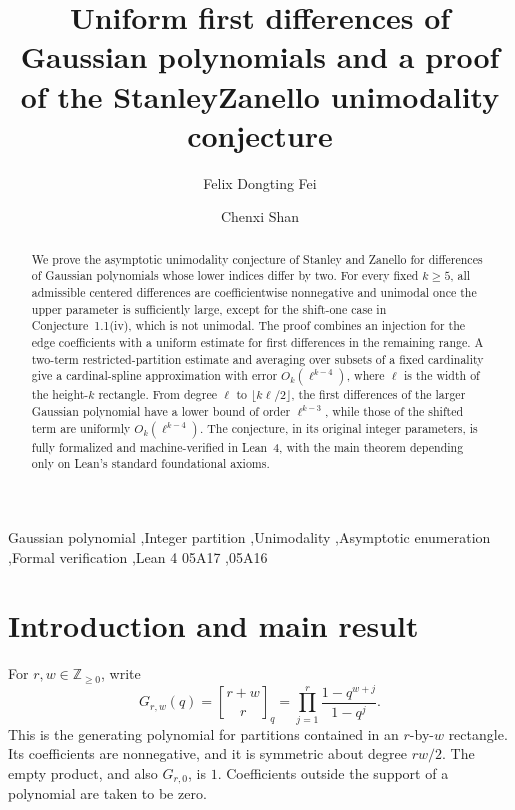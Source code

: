 \documentclass[3p,11pt,number]{elsarticle}
\theoremstyle{remark}
\numberwithin{equation}{section}
\newcommand{\qbinom}[2]{\genfrac{[}{]}{0pt}{}{#1}{#2}_q}
\newcommand{\NN}{\mathbb Z_{\ge0}}
\newcommand{\PaperTitle}{Uniform first differences of Gaussian polynomials and a proof of the Stanley\textendash{}Zanello unimodality conjecture}
\begin{document}
\begin{frontmatter}
\title{\PaperTitle}
\author[fei]{Felix Dongting Fei}
\author[shan]{Chenxi Shan}
\address[fei]{Independent Researcher, London, United Kingdom}
\address[shan]{City University of Hong Kong, Hong Kong SAR, China}
\begin{abstract}
We prove the asymptotic unimodality conjecture of Stanley and Zanello for
differences of Gaussian polynomials whose lower indices differ by two.
For every fixed \(k\ge5\), all admissible centered differences are
coefficientwise nonnegative and unimodal once the upper parameter is
sufficiently large, except for the shift-one case in Conjecture~1.1(iv), which is not
unimodal.
The proof combines an injection for the edge coefficients with a uniform
estimate for first differences in the remaining range. A two-term
restricted-partition estimate and averaging over subsets of a fixed
cardinality give a cardinal-spline approximation with error
\(O_k(\ell^{k-4})\), where \(\ell\) is the width of the height-\(k\) rectangle.
From degree \(\ell\) to \(\lfloor k\ell/2\rfloor\), the first differences
of the larger Gaussian polynomial have a lower bound of order \(\ell^{k-3}\), while those of the shifted
term are uniformly \(O_k(\ell^{k-4})\).
The conjecture, in its original integer parameters, is fully formalized and
machine-verified in Lean~4, with the main theorem depending only on Lean's
standard foundational axioms.
\end{abstract}
\begin{keyword}
Gaussian polynomial \sep Integer partition \sep Unimodality \sep Asymptotic enumeration \sep Formal verification \sep Lean 4
\MSC[2020] 05A17 \sep 05A16
\end{keyword}
\end{frontmatter}

\section{Introduction and main result}

For \(r,w\in\NN\), write
\begin{equation}\label{eq:G}
G_{r,w}(q)=\qbinom{r+w}{r}
=\prod_{j=1}^{r}\frac{1-q^{w+j}}{1-q^j}.
\end{equation}
This is the generating polynomial for partitions contained in an
\(r\)-by-\(w\) rectangle. Its coefficients are nonnegative, and it is
symmetric about degree \(rw/2\). The empty product, and also \(G_{r,0}\),
is \(1\). Coefficients outside the support of a polynomial are taken to
be zero.
\end{document}
